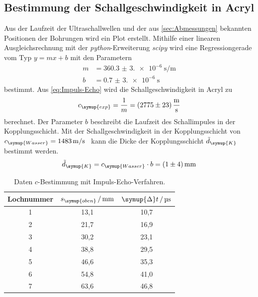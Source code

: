 \subsection{Bestimmung der Schallgeschwindigkeit in Acryl}
Aus der Laufzeit der Ultraschallwellen und der aus \ref{sec:Abmessungen} bekannten Positionen der Bohrungen wird ein Plot erstellt. Mithilfe einer 
linearen Ausgleichsrechnung mit der \textit{python}-Erweiterung \textit{scipy} \cite{scipy} wird eine Regressiongerade vom Typ $y=mx+b$ mit den
Parametern
\begin{align*}
    m &= \qty{360.3(3.0)e-6}{\second\per\metre} \\
    b &= \qty{0.7(3.0)e-6}{\second}
\end{align*}
bestimmt. Aus \eqref{eq:Impuls-Echo} wird die Schallgeschwindigkeit in Acryl zu
\begin{equation*}
    c_{\symup{exp}} = \frac{1}{m} = \qty{2775+-23}{\metre\per\second}
\end{equation*}
berechnet. Der Parameter $b$ beschreibt die Laufzeit des Schallimpules in der Kopplungsschicht. Mit der Schallgeschwindigkeit in der Kopplungsschicht
von $c_{\symup{Wasser}} = \qty{1483}{\metre\per\second}$~\cite{czichos} kann die Dicke der Kopplungsschicht $\tilde{d}_{\symup{K}}$ bestimmt werden.
\begin{equation*}
    \tilde{d}_{\symup{K}} = c_{\symup{Wasser}} \cdot b = \qty{1+-4}{\milli\metre}
\end{equation*}

\begin{table}[H]
    \centering
    \caption{Daten $c$-Bestimmung mit Impuls-Echo-Verfahren.}
    \label{tab:c-bestimmung}
    \begin{tabular}{S[table-format=1.0] S[table-format=2.1] S[table-format=2.1]}
        \toprule
         {Lochnummer} & {$s_{\symup{oben}}\,/\,\unit{\milli\metre}$} & {$\symup{\Delta}t\,/\,\unit{\micro\second}$} \\
        	& 13,1	& 10,7 \\
         2	& 21,7	& 16,9 \\
         3	& 30,2	& 23,1 \\
         4	& 38,8	& 29,5 \\
         5	& 46,6	& 35,3 \\
         6	& 54,8	& 41,0 \\
         7	& 63,6	& 46,8 \\ 
        \bottomrule 
    \end{tabular}
  \end{table}

